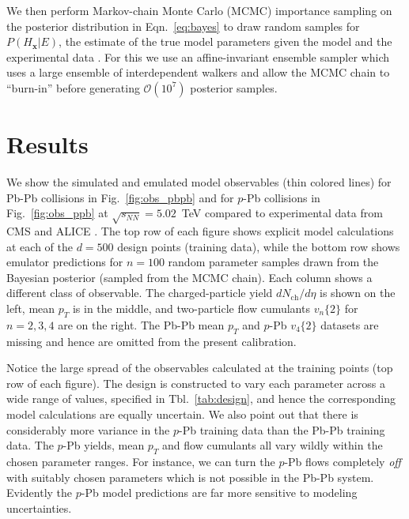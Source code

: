 \documentclass[aps,prc,reprint,amsmath,nofootinbib]{revtex4-1}
\newcommand{\sqrts}{\sqrt{s_{NN}}}
\newcommand{\nch}{N_\text{ch}}
\newcommand{\x}{\mathbf{x}}
\newcommand{\vnk}[2]{v_#1\{#2\}}
\newcommand{\order}[1]{$\mathcal O(10^{#1})$}
\begin{document}
We then perform Markov-chain Monte Carlo (MCMC) importance sampling on the posterior distribution in Eqn.~\eqref{eq:bayes} to draw random samples for $P(H_\x | E)$, the estimate of the true model parameters given the model and the experimental data \cite{Goodman:2010en, FM:2013mc}.
For this we use an affine-invariant ensemble sampler which uses a large ensemble of interdependent walkers \cite{Goodman:2010en, FM:2013mc} and allow the MCMC chain to ``burn-in'' before generating \order{7} posterior samples.


\section{Results}
\label{sec:results}

We show the simulated and emulated model observables (thin colored lines) for Pb-Pb collisions in Fig.~\ref{fig:obs_pbpb} and for \mbox{$p$-Pb} collisions in Fig.~\ref{fig:obs_ppb} at $\sqrts=5.02$~TeV compared to experimental data from CMS \cite{Chatrchyan:2013nka} and ALICE \cite{Adam:2015ptt, Adam:2016izf, Adam:2014qja, Abelev:2013bla}.
The top row of each figure shows explicit model calculations at each of the $d=500$ design points (training data), while the bottom row shows emulator predictions for $n=100$ random parameter samples drawn from the Bayesian posterior (sampled from the MCMC chain).
Each column shows a different class of observable.
The charged-particle yield $d\nch/d\eta$ is shown on the left, mean $p_T$ is in the middle, and two-particle flow cumulants $\vnk{n}{2}$ for $n=2,3,4$ are on the right.
The Pb-Pb mean $p_T$ and $p$-Pb $\vnk{4}{2}$ datasets are missing and hence are omitted from the present calibration.

Notice the large spread of the observables calculated at the training points (top row of each figure).
The design is constructed to vary each parameter across a wide range of values, specified in Tbl.~\ref{tab:design}, and hence the corresponding model calculations are equally uncertain.
We also point out that there is considerably more variance in the $p$-Pb training data than the Pb-Pb training data.
The $p$-Pb yields, mean $p_T$ and flow cumulants all vary wildly within the chosen parameter ranges.
For instance, we can turn the $p$-Pb flows completely \emph{off} with suitably chosen parameters which is not possible in the Pb-Pb system.
Evidently the $p$-Pb model predictions are far more sensitive to modeling uncertainties.
\end{document}
